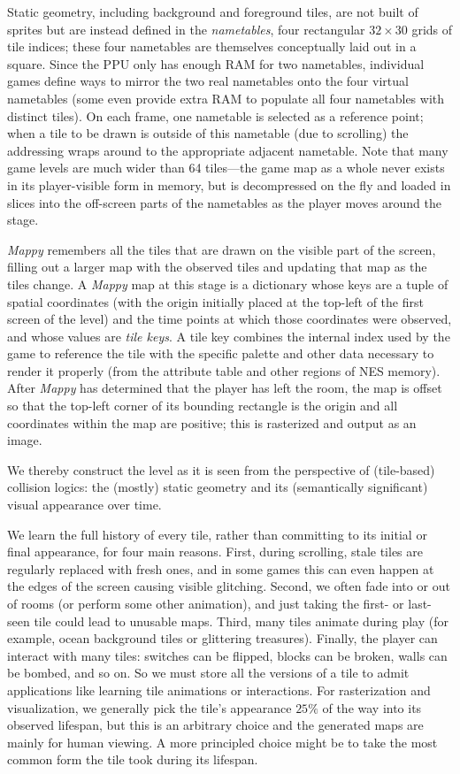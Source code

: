 \documentclass[12pt]{report}
\begin{document}
Static geometry, including background and foreground tiles, are not built of sprites but are instead defined in the \emph{nametables}, four rectangular \(32 \times 30\) grids of tile indices; these four nametables are themselves conceptually laid out in a square.
Since the PPU only has enough RAM for two nametables, individual games define ways to mirror the two real nametables onto the four virtual nametables (some even provide extra RAM to populate all four nametables with distinct  tiles).
On each frame, one nametable is selected as a reference point; when a tile to be drawn is outside of this nametable (due to scrolling) the addressing wraps around to the appropriate adjacent nametable.
Note that many game levels are much wider than 64 tiles---the game map as a whole never exists in its player-visible form in memory, but is decompressed on the fly and loaded in slices into the off-screen parts of the nametables as the player moves around the stage.

\emph{Mappy} remembers all the tiles that are drawn on the visible part of the screen, filling out a larger map with the observed tiles and updating that map as the tiles change.
A \emph{Mappy} map at this stage is a dictionary whose keys are a tuple of spatial coordinates (with the origin initially placed at the top-left of the first screen of the level) and the time points at which those coordinates were observed, and whose values are \emph{tile keys}.
A tile key combines the internal index used by the game to reference the tile with the specific palette and other data necessary to render it properly (from the attribute table and other regions of NES memory).
After \emph{Mappy} has determined that the player has left the room, the map is offset so that the top-left corner of its bounding rectangle is the origin and all coordinates within the map are positive; this is rasterized and output as an image.

We thereby construct the level as it is seen from the perspective of (tile-based) collision logics: the (mostly) static geometry and its (semantically significant) visual appearance over time.

We learn the full history of every tile, rather than committing to its initial or final appearance, for four main reasons.
First, during scrolling, stale tiles are regularly replaced with fresh ones, and in some games this can even happen at the edges of the screen causing visible glitching.
Second, we often fade into or out of rooms (or perform some other animation), and just taking the first- or last- seen tile could lead to unusable maps.
Third, many tiles animate during play (for example, ocean background tiles or glittering treasures).
Finally, the player can interact with many tiles: switches can be flipped, blocks can be broken, walls can be bombed, and so on.
So we must store all the versions of a tile to admit applications like learning tile animations or interactions.
For rasterization and visualization, we generally pick the tile's appearance $25\%$ of the way into its observed lifespan, but this is an arbitrary choice and the generated maps are mainly for human viewing.
A more principled choice might be to take the most common form the tile took during its lifespan.
\end{document}
